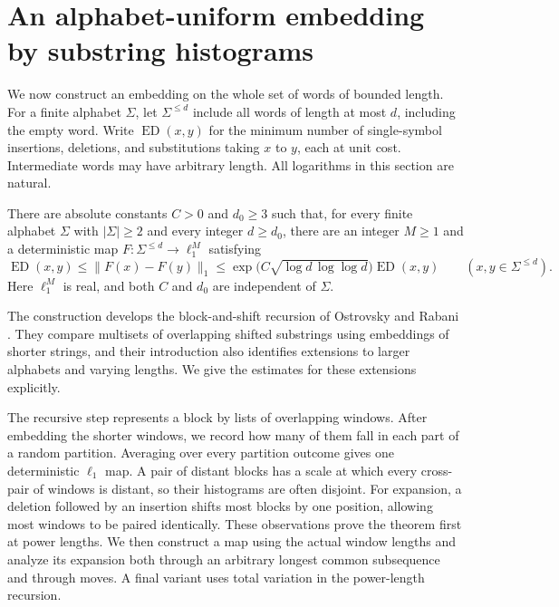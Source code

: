 \section{An alphabet-uniform embedding by substring histograms}
\label{upper:section}

We now construct an embedding on the whole set of words of bounded length.
For a finite alphabet $\Sigma$, let $\Sigma^{\le d}$ include all words of
length at most $d$, including the empty word.  Write $\operatorname{ED}(x,y)$
for the minimum number of single-symbol insertions, deletions, and
substitutions taking $x$ to $y$, each at unit cost.  Intermediate words may
have arbitrary length.  All logarithms in this section are natural.

\begin{theorem}
\label{upper:uniform}\label{thm:uniform-upper}
There are absolute constants $C>0$ and $d_0\ge3$ such that, for every finite
alphabet $\Sigma$ with $|\Sigma|\ge2$ and every integer $d\ge d_0$, there
are an integer $M\ge1$ and a deterministic map
$F:\Sigma^{\le d}\longrightarrow\ell_1^M$ satisfying
\[
 \operatorname{ED}(x,y)\le \|F(x)-F(y)\|_1
 \le \exp\!\bigl(C\sqrt{\log d\,\log\log d}\bigr)
       \operatorname{ED}(x,y)
 \qquad(x,y\in\Sigma^{\le d}).
\]
Here $\ell_1^M$ is real, and both $C$ and $d_0$ are independent of $\Sigma$.
\end{theorem}

The construction develops the block-and-shift recursion of Ostrovsky and
Rabani \cite{OstrovskyRabani2007}.  They compare multisets of overlapping
shifted substrings using embeddings of shorter strings, and their
introduction also identifies extensions to larger alphabets and varying
lengths.  We give the estimates for these extensions explicitly.

The recursive step represents a block by lists of overlapping windows.
After embedding the shorter windows, we record how many of them fall in
each part of a random partition. Averaging over every partition outcome
gives one deterministic $\ell_1$ map. A pair of distant blocks has a
scale at which every cross-pair of windows is distant, so their histograms
are often disjoint. For expansion, a deletion followed by an insertion
shifts most blocks by one position, allowing most windows to be paired
identically. These observations prove the theorem first at power lengths.
We then construct a map using the actual window lengths and analyze its
expansion both through an arbitrary longest common subsequence and through
moves. A final variant uses total variation in the power-length recursion.

